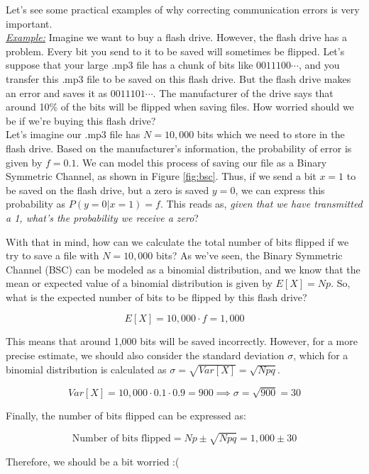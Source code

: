 \documentclass[a4paper,10pt]{article}
\begin{document}
Let's see some practical examples of why correcting communication errors is very important.\\

\noindent \underline{\textit{Example:}} Imagine we want to buy a flash drive. However, the flash drive has a problem. Every bit you send to it to be saved will sometimes be flipped. Let's suppose that your large .mp3 file has a chunk of bits like $0011100\cdots$, and you transfer this .mp3 file to be saved on this flash drive. But the flash drive makes an error and saves it as $0011101\cdots$. The manufacturer of the drive says that around 10\% of the bits will be flipped when saving files. How worried should we be if we're buying this flash drive?\\


Let's imagine our .mp3 file has $N = 10,000$ bits which we need to store in the flash drive. Based on the manufacturer's information, the probability of error is given by $f = 0.1$. We can model this process of saving our file as a Binary Symmetric Channel, as shown in Figure \ref{fig:bsc}. Thus, if we send a bit $x = 1$ to be saved on the flash drive, but a zero is saved $y = 0$, we can express this probability as $P(y = 0 | x = 1) = f$. This reads as, \textit{given that we have transmitted a 1, what's the probability we receive a zero}?

With that in mind, how can we calculate the total number of bits flipped if we try to save a file with $N = 10,000$ bits? As we've seen, the Binary Symmetric Channel (BSC) can be modeled as a binomial distribution, and we know that the mean or expected value of a binomial distribution is given by $E[X] = Np$. So, what is the expected number of bits to be flipped by this flash drive?

\[
E[X] = 10,000 \cdot f = 1,000
\]

This means that around 1,000 bits will be saved incorrectly. However, for a more precise estimate, we should also consider the standard deviation $\sigma$, which for a binomial distribution is calculated as $\sigma = \sqrt{Var[X]} = \sqrt{Npq}$.

\[
Var[X] = 10,000 \cdot 0.1 \cdot 0.9 = 900 \implies \sigma = \sqrt{900} = 30
\]

Finally, the number of bits flipped can be expressed as:

\[  
\text{Number of bits flipped} = Np \pm \sqrt{Npq} = 1,000 \pm 30
\]

Therefore, we should be a bit worried :(\\
\end{document}
